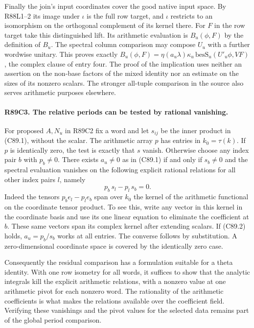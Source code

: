 Finally the join's input coordinates cover the good native input space.
By R88L1--2 its image under $\iota$ is the full row target, and
$\iota$ restricts to an isomorphism on the orthogonal complement of its
kernel there. For $F$ in the row target take this distinguished lift.
Its arithmetic evaluation is $B_u(\phi,F)$ by the definition of $B_u$.
The spectral column comparison may compose $U_u$ with a further
wordwise unitary. This proves exactly
$B_u(\phi,F)=\eta(a_u\lambda)\kappa_u\,
 \mathrm{besS}_u(U'_u\phi,VF)$, the complex clause of entry four.
The proof of the implication uses neither an assertion on the
non-base factors of the mixed identity nor an estimate on the sizes
of its nonzero scalars. The stronger all-tuple comparison in the source
also serves arithmetic purposes elsewhere.

\paragraph{R89C3. The relative periods can be tested by rational vanishing.}
For proposed $A,N_u$ in R89C2 fix a word and let $s_{ij}$ be the inner
product in (C89.1), without the scalar. The arithmetic array $p$ has
entries in $k_0=\tau(k)$. If $p$ is identically zero, the test is
exactly that $s$ vanish. Otherwise choose any index pair $b$ with
$p_b\ne0$. There exists $a_u\ne0$ as in (C89.1) if and only if
$s_b\ne0$ and the spectral evaluation vanishes on the following
explicit rational relations for all other index pairs $l$, namely
\[
                 p_b\,s_l-p_l\,s_b=0.                       \tag{C89.2}
\]
Indeed the tensors $p_b e_l-p_l e_b$ span over $k_0$ the kernel of
the arithmetic functional on the coordinate tensor product. To see
this, write any vector in this kernel in the coordinate basis and
use its one linear equation to eliminate the coefficient at $b$.
These same vectors span its complex kernel after extending scalars.
If (C89.2) holds, $a_u=p_b/s_b$ works at all entries. The converse
follows by substitution. A zero-dimensional coordinate space is covered
by the identically zero case.

Consequently the residual comparison has a formulation suitable for a
theta identity. With one row isometry for all words, it suffices to show that
the analytic integrals kill the explicit arithmetic relations, with a
nonzero value at one arithmetic pivot for each nonzero word. The
rationality of the arithmetic coefficients is what makes the relations
available over the coefficient field. Verifying these vanishings and the pivot values for the selected data
remains part of the global period comparison.
